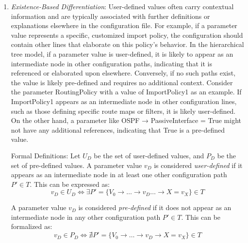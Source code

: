 \begin{enumerate}
    \item \textit{Existence-Based Differentiation}:
User-defined values often carry contextual information and are typically associated with further definitions or explanations elsewhere in the configuration file. For example, if a parameter value represents a specific, customized import policy, the configuration should contain other lines that elaborate on this policy's behavior. In the hierarchical tree model, if a parameter value is user-defined, it is likely to appear as an intermediate node in other configuration paths, indicating that it is referenced or elaborated upon elsewhere. Conversely, if no such paths exist, the value is likely pre-defined and requires no additional context. Consider the parameter RoutingPolicy with a value of ImportPolicy1 as an example. If ImportPolicy1 appears as an intermediate node in other configuration lines, such as those defining specific route maps or filters, it is likely user-defined. On the other hand, a parameter like OSPF → PassiveInterface = True might not have any additional references, indicating that True is a pre-defined value.

Formal Definitions:
Let \( U_D \) be the set of user-defined values, and \( P_D \) be the set of pre-defined values.
A parameter value \( v_D \) is considered \textit{user-defined} if it appears as an intermediate node in at least one other configuration path \( P' \in T \). This can be expressed as:
\[
v_D \in U_D \iff \exists P' = \{ V_0 \rightarrow \dots \rightarrow v_D \dots \rightarrow X = v_X \} \in T
\]

A parameter value \( v_D \) is considered \textit{pre-defined} if it does not appear as an intermediate node in any other configuration path \( P' \in T \). This can be formalized as:
\[
v_D \in P_D \iff \nexists P' = \{ V_0 \rightarrow \dots \rightarrow v_D \rightarrow X = v_X \} \in T
\]





\end{enumerate}
